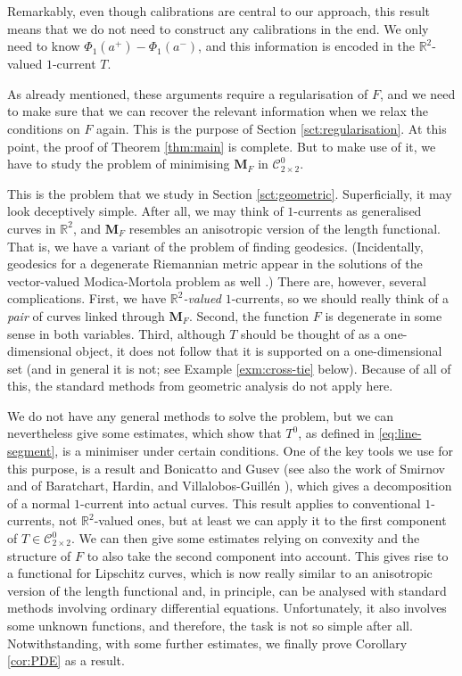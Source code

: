 \documentclass[a4paper]{article}
\newcommand{\R}{\mathbb{R}}
\newcommand{\M}{\mathbf{M}}
\newcommand{\ncrt}{\mathcal{C}}
\theoremstyle{definition}
\theoremstyle{remark}
\begin{document}
Remarkably, even though calibrations are central to our approach, this result means that we do not
need to construct any calibrations in the end. We only need to know $\Phi_1(a^+) - \Phi_1(a^-)$, and
this information is encoded in the $\R^2$-valued $1$-current $T$.

As already mentioned, these arguments require a regularisation of $F$, and we need to make sure
that we can recover the relevant information when we relax the conditions on $F$ again.
This is the purpose of Section \ref{sct:regularisation}. At this point, the proof of Theorem \ref{thm:main}
is complete. But to make use of it, we have to study the problem of minimising $\M_F$ in $\ncrt_{2 \times 2}^0$.

This is the problem that we study in Section \ref{sct:geometric}. Superficially, it may look
deceptively simple. After all, we may think of $1$-currents as generalised curves in $\R^2$, and
$\M_F$ resembles an anisotropic version of the length functional. That is, we have a variant of
the problem of finding geodesics. (Incidentally, geodesics for a degenerate Riemannian metric appear
in the solutions of the vector-valued Modica-Mortola problem as well \cite{Baldo:90}.)
There are, however, several complications. First, we have \emph{$\R^2$-valued} $1$-currents, so
we should really think of a \emph{pair} of curves linked through $\M_F$. Second, the function
$F$ is degenerate in some sense in both variables. Third, although $T$ should be thought of as a
one-dimensional object, it does not follow that it is supported on a one-dimensional set (and in
general it is not; see Example \ref{exm:cross-tie} below). Because of all of this, the standard
methods from geometric analysis do not apply here.

We do not have any general methods to solve the problem, but we can nevertheless give some
estimates, which show that $T^0$, as defined in \eqref{eq:line-segment}, is a minimiser under certain conditions. One of the key tools
we use for this purpose, is a result and Bonicatto and Gusev \cite{Bonicatto-Gusev:22}
(see also the work of Smirnov \cite{Smirnov:93} and of Baratchart, Hardin, and Villalobos-Guill\'en
\cite{Baratchart-Hardin-Villalobos-Guillen:21}), which gives a decomposition of a normal $1$-current
into actual curves. This result applies to conventional $1$-currents, not $\R^2$-valued ones,
but at least we can apply it to the first component of $T \in \ncrt_{2 \times 2}^0$.
We can then give some estimates relying on convexity and the structure of $F$ to also take the
second component into account. This gives rise to a functional for Lipschitz curves,
which is now really similar to an anisotropic version of the length functional and, in
principle, can be analysed with standard methods involving ordinary differential equations.
Unfortunately, it also involves some unknown functions, and therefore, the task is not so
simple after all. Notwithstanding, with some further estimates, we finally prove Corollary \ref{cor:PDE}
as a result.
\end{document}
